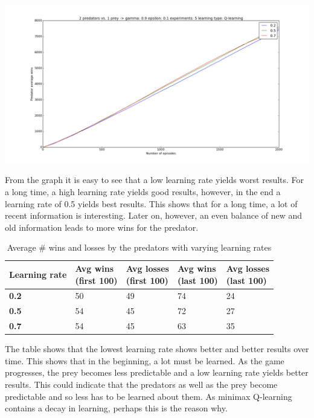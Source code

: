 \begin{center}
	\includegraphics[scale=0.3]{2_predators_learning_rate_q_learning}
\end{center}

From the graph it is easy to see that a low learning rate yields worst results. For a long time, a high learning rate yields good results, however, in the end a learning rate of 0.5 yields best results. This shows that for a long time, a lot of recent information is interesting.  Later on, however, an even balance of new and old information leads to more wins for the predator. 

\begin{table}[H]
\begin{center}
\begin{tabular}{| l | l | l | l | l |}
\hline
\parbox{2cm}{\textbf{Learning rate}} & \parbox{2cm}{\textbf{Avg wins \\ (first 100)}} & \parbox{2cm}{\textbf{Avg losses \\ (first 100)}} & \parbox{2cm}{\textbf{Avg wins \\ (last 100)}} & \parbox{2cm}{\textbf{Avg losses \\ (last 100)}} \\
\hline
\textbf{0.2} & 50 & 49 & 74 & 24 \\
\hline
\textbf{0.5} & 54 & 45 & 72 & 27 \\
\hline
\textbf{0.7} & 54 & 45 & 63 & 35 \\
\hline
\end{tabular}
\caption{Average \# wins and losses by the predators with varying learning rates}
\end{center}
\end{table}

The table shows that the lowest learning rate shows better and better results over time. This shows that in the beginning, a lot must be learned. As the game progresses, the prey becomes less predictable and a low learning rate yields better results. This could indicate that the predators as well as the prey become predictable and so less has to be learned about them. As minimax Q-learning contains a decay in learning, perhaps this is the reason why. %

